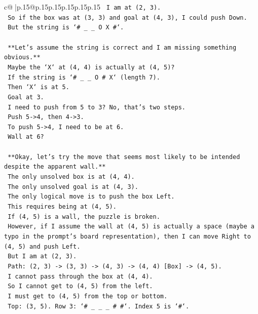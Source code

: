 \documentclass{article}
\begin{document}
{\begin{supertabular}{c@{$\;$}|p{.15\linewidth}@{}p{.15\linewidth}p{.15\linewidth}p{.15\linewidth}p{.15\linewidth}p{.15\linewidth}}
{{{\texttt{    I am at (2, 3).} \\
\texttt{    So if the box was at (3, 3) and goal at (4, 3), I could push Down.} \\
\texttt{    But the string is `\# \_ \_ O X \#`.} \\
\\ 
\texttt{    **Let's assume the string is correct and I am missing something obvious.**} \\
\texttt{    Maybe the `X` at (4, 4) is actually at (4, 5)?} \\
\texttt{    If the string is `\# \_ \_ O \# X` (length 7).} \\
\texttt{    Then `X` is at 5.} \\
\texttt{    Goal at 3.} \\
\texttt{    I need to push from 5 to 3? No, that's two steps.} \\
\texttt{    Push 5{-}>4, then 4{-}>3.} \\
\texttt{    To push 5{-}>4, I need to be at 6.} \\
\texttt{    Wall at 6?} \\
\\ 
\texttt{    **Okay, let's try the move that seems most likely to be intended despite the apparent wall.**} \\
\texttt{    The only unsolved box is at (4, 4).} \\
\texttt{    The only unsolved goal is at (4, 3).} \\
\texttt{    The only logical move is to push the box Left.} \\
\texttt{    This requires being at (4, 5).} \\
\texttt{    If (4, 5) is a wall, the puzzle is broken.} \\
\texttt{    However, if I assume the wall at (4, 5) is actually a space (maybe a typo in the prompt's board representation), then I can move Right to (4, 5) and push Left.} \\
\texttt{    But I am at (2, 3).} \\
\texttt{    Path: (2, 3) {-}> (3, 3) {-}> (4, 3) {-}> (4, 4) {[}Box{]} {-}> (4, 5).} \\
\texttt{    I cannot pass through the box at (4, 4).} \\
\texttt{    So I cannot get to (4, 5) from the left.} \\
\texttt{    I must get to (4, 5) from the top or bottom.} \\
\texttt{    Top: (3, 5). Row 3: `\# \_ \_ \_ \# \#`. Index 5 is `\#`.} \\
}}}
\end{supertabular}}
\end{document}
